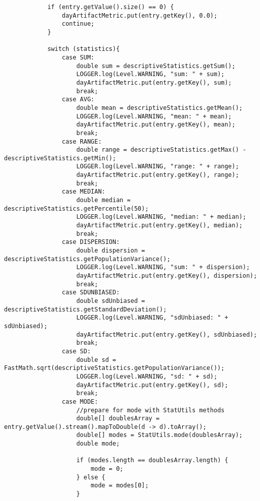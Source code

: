 \begin{lstlisting}
            if (entry.getValue().size() == 0) {
                dayArtifactMetric.put(entry.getKey(), 0.0);
                continue;
            }

            switch (statistics){
                case SUM:
                    double sum = descriptiveStatistics.getSum();
                    LOGGER.log(Level.WARNING, "sum: " + sum);
                    dayArtifactMetric.put(entry.getKey(), sum);
                    break;
                case AVG:
                    double mean = descriptiveStatistics.getMean();
                    LOGGER.log(Level.WARNING, "mean: " + mean);
                    dayArtifactMetric.put(entry.getKey(), mean);
                    break;
                case RANGE:
                    double range = descriptiveStatistics.getMax() - descriptiveStatistics.getMin();
                    LOGGER.log(Level.WARNING, "range: " + range);
                    dayArtifactMetric.put(entry.getKey(), range);
                    break;
                case MEDIAN:
                    double median = descriptiveStatistics.getPercentile(50);
                    LOGGER.log(Level.WARNING, "median: " + median);
                    dayArtifactMetric.put(entry.getKey(), median);
                    break;
                case DISPERSION:
                    double dispersion = descriptiveStatistics.getPopulationVariance();
                    LOGGER.log(Level.WARNING, "sum: " + dispersion);
                    dayArtifactMetric.put(entry.getKey(), dispersion);
                    break;
                case SDUNBIASED:
                    double sdUnbiased = descriptiveStatistics.getStandardDeviation();
                    LOGGER.log(Level.WARNING, "sdUnbiased: " + sdUnbiased);
                    dayArtifactMetric.put(entry.getKey(), sdUnbiased);
                    break;
                case SD:
                    double sd = FastMath.sqrt(descriptiveStatistics.getPopulationVariance());
                    LOGGER.log(Level.WARNING, "sd: " + sd);
                    dayArtifactMetric.put(entry.getKey(), sd);
                    break;
                case MODE:
                    //prepare for mode with StatUtils methods
                    double[] doublesArray = entry.getValue().stream().mapToDouble(d -> d).toArray();
                    double[] modes = StatUtils.mode(doublesArray);
                    double mode;

                    if (modes.length == doublesArray.length) {
                        mode = 0;
                    } else {
                        mode = modes[0];
                    }


\end{lstlisting}

